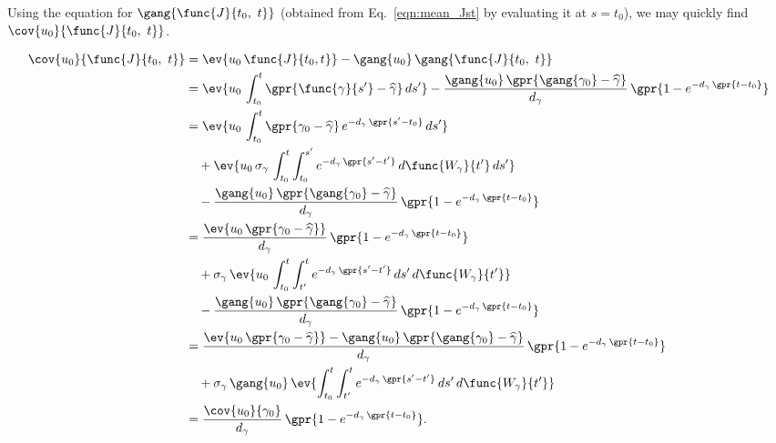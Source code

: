 Using the equation for $\gang{\func{J}{t_0,\ t}}$ (obtained from Eq.~\ref{eqn:mean_Jst} by evaluating it at $s = t_0$), we may quickly find $\cov{u_0}{\func{J}{t_0,\ t}}$.

\begin{align}
    \cov{u_0}{\func{J}{t_0,\ t}} &= \ev{u_0\,\func{J}{t_0, t}} - \gang{u_0}\,\gang{\func{J}{t_0,\ t}} \nonumber \\
    	&= \ev{u_0\,\int_{t_0}^{t} \gpr{\func{\gamma}{s'} - \widehat{\gamma}}\,ds'} - \frac{\gang{u_0}\,\gpr{\gang{\gamma_0} - \widehat{\gamma}}}{d_{\gamma}}\,\gpr{1 - e^{-d_{\gamma}\,\gpr{t - t_0}}} \nonumber \\
    	&= \ev{u_0\,\int_{t_0}^{t} \gpr{\gamma_0 - \widehat{\gamma}}\,e^{-d_{\gamma}\,\gpr{s' - t_0}}\,ds'} \nonumber \\
    		&\quad + \ev{u_0\,\sigma_{\gamma}\,\int_{t_0}^{t} \int_{t_0}^{s'} e^{-d_{\gamma}\,\gpr{s' - t'}}\,d\func{W_{\gamma}}{t'}\,ds'} \nonumber \\
    		&\quad - \frac{\gang{u_0}\,\gpr{\gang{\gamma_0} - \widehat{\gamma}}}{d_{\gamma}}\,\gpr{1 - e^{-d_{\gamma}\,\gpr{t - t_0}}} \nonumber \\
    	&= \frac{\ev{u_0\,\gpr{\gamma_0 - \widehat{\gamma}}}}{d_{\gamma}}\,\gpr{1 - e^{-d_{\gamma}\,\gpr{t - t_0}}} \nonumber \\
    		&\quad + \sigma_{\gamma}\,\ev{u_0\,\int_{t_0}^{t} \int_{t'}^{t} e^{-d_{\gamma}\,\gpr{s' - t'}}\,ds'\,d\func{W_{\gamma}}{t'}} \nonumber \\
    		&\quad - \frac{\gang{u_0}\,\gpr{\gang{\gamma_0} - \widehat{\gamma}}}{d_{\gamma}}\,\gpr{1 - e^{-d_{\gamma}\,\gpr{t - t_0}}} \nonumber \\
    	&= \frac{\ev{u_0\,\gpr{\gamma_0 - \widehat{\gamma}}} - \gang{u_0}\,\gpr{\gang{\gamma_0} - \widehat{\gamma}}}{d_{\gamma}}\,\gpr{1 - e^{-d_{\gamma}\,\gpr{t - t_0}}} \nonumber \\
    		&\quad + \sigma_{\gamma}\,\gang{u_0}\,\ev{\int_{t_0}^{t} \int_{t'}^{t} e^{-d_{\gamma}\,\gpr{s' - t'}}\,ds'\,d\func{W_{\gamma}}{t'}} \nonumber \\
    	&= \frac{\cov{u_0}{\gamma_0}}{d_{\gamma}}\,\gpr{1 - e^{-d_{\gamma}\,\gpr{t - t_0}}}. \label{eqn:cov_u0_Jt0t}
\end{align}